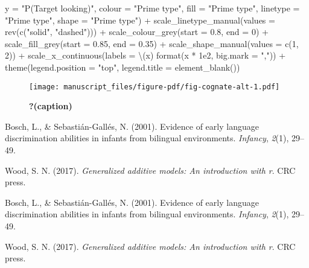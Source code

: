 \documentclass[
  letterpaper,
  DIV=11,
  numbers=noendperiod]{scrartcl}
\newenvironment{Shaded}{\begin{snugshade}}{\end{snugshade}}
\newcommand{\AttributeTok}[1]{\textcolor[rgb]{0.40,0.45,0.13}{#1}}
\newcommand{\DecValTok}[1]{\textcolor[rgb]{0.68,0.00,0.00}{#1}}
\newcommand{\FloatTok}[1]{\textcolor[rgb]{0.68,0.00,0.00}{#1}}
\newcommand{\FunctionTok}[1]{\textcolor[rgb]{0.28,0.35,0.67}{#1}}
\newcommand{\NormalTok}[1]{\textcolor[rgb]{0.00,0.23,0.31}{#1}}
\newcommand{\SpecialCharTok}[1]{\textcolor[rgb]{0.37,0.37,0.37}{#1}}
\newcommand{\StringTok}[1]{\textcolor[rgb]{0.13,0.47,0.30}{#1}}
\newlength{\cslhangindent}
\newlength{\cslentryspacingunit} %
\newenvironment{CSLReferences}[2] %
 {%
  \setlength{\parindent}{0pt}
  \ifodd #1
  \let\oldpar\par
  \def\par{\hangindent=\cslhangindent\oldpar}
  \fi
  \setlength{\parskip}{#2\cslentryspacingunit}
 }%
 {}
\begin{document}
\begin{Shaded}
\begin{Highlighting}[]
         \AttributeTok{y =} \StringTok{"P(Target looking)"}\NormalTok{,}
         \AttributeTok{colour =} \StringTok{"Prime type"}\NormalTok{,}
         \AttributeTok{fill =} \StringTok{"Prime type"}\NormalTok{,}
         \AttributeTok{linetype =} \StringTok{"Prime type"}\NormalTok{,}
         \AttributeTok{shape =} \StringTok{"Prime type"}\NormalTok{) }\SpecialCharTok{+}
    \FunctionTok{scale\_linetype\_manual}\NormalTok{(}\AttributeTok{values =} \FunctionTok{rev}\NormalTok{(}\FunctionTok{c}\NormalTok{(}\StringTok{"solid"}\NormalTok{, }\StringTok{"dashed"}\NormalTok{))) }\SpecialCharTok{+}
    \FunctionTok{scale\_colour\_grey}\NormalTok{(}\AttributeTok{start =} \FloatTok{0.8}\NormalTok{, }\AttributeTok{end =} \DecValTok{0}\NormalTok{) }\SpecialCharTok{+}
    \FunctionTok{scale\_fill\_grey}\NormalTok{(}\AttributeTok{start =} \FloatTok{0.85}\NormalTok{, }\AttributeTok{end =} \FloatTok{0.35}\NormalTok{) }\SpecialCharTok{+}
    \FunctionTok{scale\_shape\_manual}\NormalTok{(}\AttributeTok{values =} \FunctionTok{c}\NormalTok{(}\DecValTok{1}\NormalTok{, }\DecValTok{2}\NormalTok{)) }\SpecialCharTok{+}
    \FunctionTok{scale\_x\_continuous}\NormalTok{(}\AttributeTok{labels =}\NormalTok{ \textbackslash{}(x) }\FunctionTok{format}\NormalTok{(x }\SpecialCharTok{*} \FloatTok{1e2}\NormalTok{, }\AttributeTok{big.mark =} \StringTok{","}\NormalTok{)) }\SpecialCharTok{+}
    \FunctionTok{theme}\NormalTok{(}\AttributeTok{legend.position =} \StringTok{"top"}\NormalTok{,}
          \AttributeTok{legend.title =} \FunctionTok{element\_blank}\NormalTok{())}
\end{Highlighting}
\end{Shaded}

\begin{figure}[H]

{\centering \texttt{[image: manuscript\_files/figure-pdf/fig-cognate-alt-1.pdf]}

}

\caption{\label{fig-cognate-alt}\textbf{?(caption)}}

\end{figure}

\hypertarget{refs}{}
\begin{CSLReferences}{1}{0}
\leavevmode{}%
Bosch, L., \& Sebastián-Gallés, N. (2001). Evidence of early language
discrimination abilities in infants from bilingual environments.
\emph{Infancy}, \emph{2}(1), 29--49.

\leavevmode{}%
Wood, S. N. (2017). \emph{Generalized additive models: An introduction
with r}. CRC press.

\leavevmode{}%
Bosch, L., \& Sebastián-Gallés, N. (2001). Evidence of early language
discrimination abilities in infants from bilingual environments.
\emph{Infancy}, \emph{2}(1), 29--49.

\leavevmode{}%
Wood, S. N. (2017). \emph{Generalized additive models: An introduction
with r}. CRC press.

\end{CSLReferences}
\end{document}
